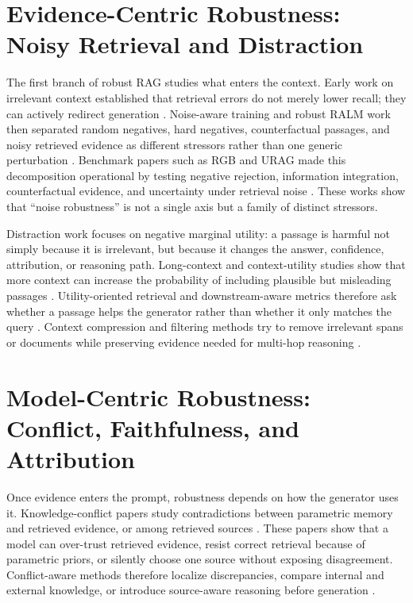 \section{Evidence-Centric Robustness: Noisy Retrieval and Distraction}

The first branch of robust RAG studies what enters the context. Early work on irrelevant context established that retrieval errors do not merely lower recall; they can actively redirect generation \cite{irrelevantContext2023}. Noise-aware training and robust RALM work then separated random negatives, hard negatives, counterfactual passages, and noisy retrieved evidence as different stressors rather than one generic perturbation \cite{raat2024,rrag037,rrag091}. Benchmark papers such as RGB and URAG made this decomposition operational by testing negative rejection, information integration, counterfactual evidence, and uncertainty under retrieval noise \cite{rgb2023,rrag001}. These works show that ``noise robustness'' is not a single axis but a family of distinct stressors.

Distraction work focuses on negative marginal utility: a passage is harmful not simply because it is irrelevant, but because it changes the answer, confidence, attribution, or reasoning path. Long-context and context-utility studies show that more context can increase the probability of including plausible but misleading passages \cite{rrag003,rrag039,rrag032}. Utility-oriented retrieval and downstream-aware metrics therefore ask whether a passage helps the generator rather than whether it only matches the query \cite{rrag058,rrag067,rrag073,rrag081}. Context compression and filtering methods try to remove irrelevant spans or documents while preserving evidence needed for multi-hop reasoning \cite{rrag044,chainOfNote2023,sufficientContext2024,rrag043}.

\section{Model-Centric Robustness: Conflict, Faithfulness, and Attribution}

Once evidence enters the prompt, robustness depends on how the generator uses it. Knowledge-conflict papers study contradictions between parametric memory and retrieved evidence, or among retrieved sources \cite{tugOfWar2024,faithfulRAG2025,astuteRAG2025,rrag046}. These papers show that a model can over-trust retrieved evidence, resist correct retrieval because of parametric priors, or silently choose one source without exposing disagreement. Conflict-aware methods therefore localize discrepancies, compare internal and external knowledge, or introduce source-aware reasoning before generation \cite{rrag008,rrag013,rrag017,rrag024,rrag029}.

